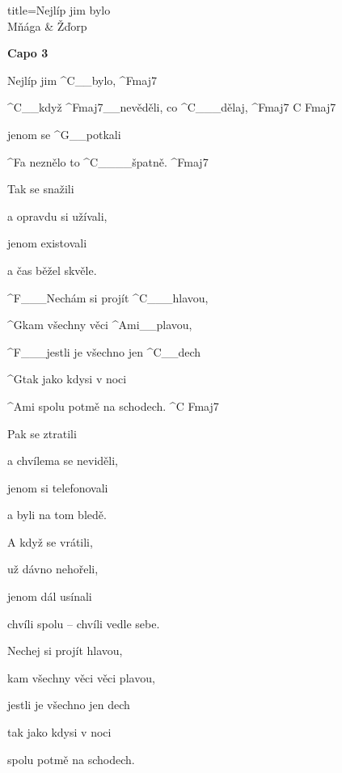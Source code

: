 \begin{song}{title=\predtitle\centering Nejlíp jim bylo \\\large Mňága \& Žďorp  \vspace*{-0.3cm}}  %
\begin{centerjustified}

\textbf{Capo 3}

\sloka 
	Nejlíp jim ^{C{\color{white}\_\_}}bylo, ^{Fmaj7}
	
	^{C{\color{white}\_\_}}když ^{Fmaj7{\color{white}\_\_}}nevěděli, co ^{C{\color{white}\_\_\_}}dělaj, ^{Fmaj7\,\,C\,\,Fmaj7}
	
	jenom se ^{G{\color{white}\_\_}}potkali 

	^{F}a neznělo to ^{C{\color{white}\_\_\_\_}}špatně. ^{Fmaj7} 

\sloka
	Tak se snažili 
	
	a opravdu si užívali,
	
	jenom existovali 
	
	a čas běžel skvěle.

	^{F{\color{white}\_\_\_}}Nechám si projít ^{C{\color{white}\_\_\_}}hlavou,
	
	^{G}kam všechny věci ^{Ami{\color{white}\_\_}}plavou,
	
	^{F{\color{white}\_\_\_}}jestli je všechno jen ^{C{\color{white}\_\_}}dech

	^{G}tak jako kdysi v noci 

	^{Ami\,\,}spolu potmě na schodech. ^{C\,\,Fmaj7}

\sloka
	Pak se ztratili 

	a chvílema se neviděli,

	jenom si telefonovali 

	a byli na tom bledě.

\sloka
	A když se vrátili,
	
	už dávno nehořeli,

	jenom dál usínali

	chvíli spolu -- chvíli vedle sebe.


	Nechej si projít hlavou,
	
	kam všechny věci věci plavou,
	
	jestli je všechno jen dech
	
	tak jako kdysi v noci 

	spolu potmě na schodech.


\end{centerjustified}
\setcounter{Slokočet}{0}
\end{song}
